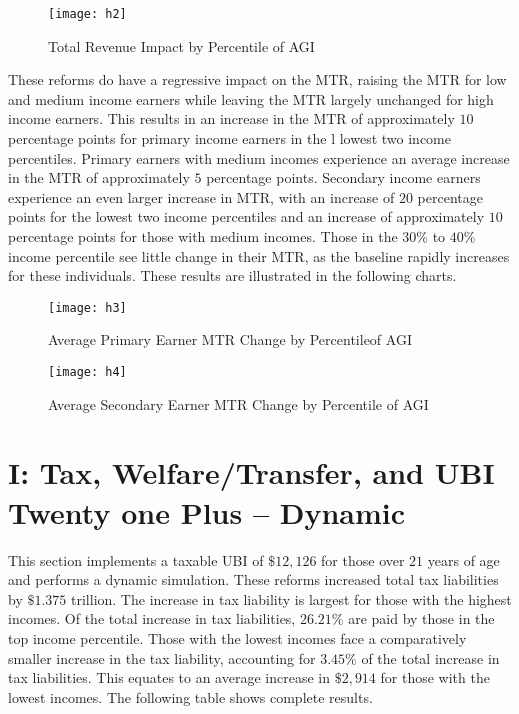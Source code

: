 \documentclass{article}
\begin{document}
\begin{figure}[H]
\centering
\caption{Total Revenue Impact by Percentile of AGI}
\texttt{[image: h2]}
\end{figure}

These reforms do have a regressive impact on the MTR, raising the MTR for low and medium income earners while leaving the MTR largely unchanged for high income earners. This results in an increase in the MTR of approximately $10$ percentage points for primary income earners in the l lowest two income percentiles. Primary earners with medium incomes experience an average increase in the MTR of approximately $5$ percentage points. Secondary income earners experience an even larger increase in MTR, with an increase of $20$ percentage points for the lowest two income percentiles and an increase of approximately $10$ percentage points for those with medium incomes. Those in the $30\%$ to $40\%$ income percentile see little change in their MTR, as the baseline rapidly increases for these individuals. These results are illustrated in the following charts. 

\begin{figure}[H]
\centering
\caption{Average Primary Earner MTR Change by Percentileof AGI}
\texttt{[image: h3]}
\end{figure}

\begin{figure}[H]
\centering
\caption{Average Secondary Earner MTR Change by Percentile of AGI}
\texttt{[image: h4]}
\end{figure}

\section{I: Tax, Welfare/Transfer, and UBI Twenty one Plus -- Dynamic}
This section implements a taxable UBI of $\$12,126$ for those over $21$ years of age and performs a dynamic simulation. These reforms increased total tax liabilities by $\$1.375$ trillion. The increase in tax liability is largest for those with the highest incomes. Of the total increase in tax liabilities, $26.21\%$ are paid by those in the top income percentile. Those with the lowest incomes face a comparatively smaller increase in the tax liability, accounting for $3.45\%$ of the total increase in tax liabilities. This equates to an average increase in $\$2,914$ for those with the lowest incomes. The following table shows complete results.
\end{document}
